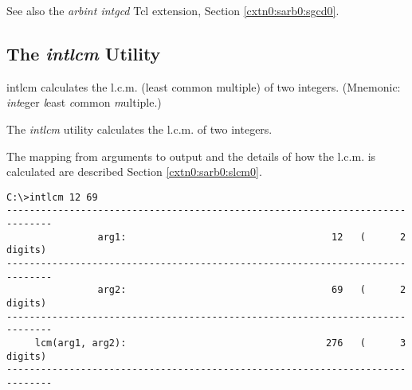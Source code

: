 \begin{dosutilcommandseealso}
See also the \emph{arbint intgcd} Tcl extension, 
Section \cxtnzeroxrefhyphen{}\ref{cxtn0:sarb0:sgcd0}.
\end{dosutilcommandseealso}

\subsection{The \emph{intlcm} Utility}
\label{cdcm0:sali0:slcm0}

\begin{dosutilcommandname}{intlcm}%
calculates the l.c.m. (least common multiple)
of two integers.  (Mnemonic:  \emph{int}eger
\emph{l}east \emph{c}ommon \emph{m}ultiple.)
\end{dosutilcommandname}

\begin{dosutilcommandsynopsis}
\end{dosutilcommandsynopsis}

\begin{dosutilcommanddescription}
The \emph{intlcm} utility calculates the l.c.m. of two
integers.

The mapping from arguments to output and the details
of how the l.c.m. is calculated are described
Section \cxtnzeroxrefhyphen{}\ref{cxtn0:sarb0:slcm0}.
\end{dosutilcommanddescription}

\begin{dosutilcommandsampleinvocations}
\begin{scriptsize}
\begin{verbatim}
C:\>intlcm 12 69
------------------------------------------------------------------------------
                arg1:                                    12   (      2 digits)
------------------------------------------------------------------------------
                arg2:                                    69   (      2 digits)
------------------------------------------------------------------------------
     lcm(arg1, arg2):                                   276   (      3 digits)
------------------------------------------------------------------------------
\end{verbatim}
\end{scriptsize}
\end{dosutilcommandsampleinvocations}

